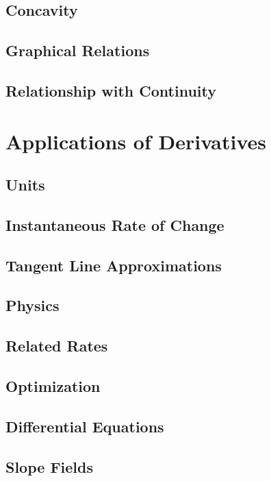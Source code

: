 \documentclass{article}
\begin{document}
\subsection{Concavity} 
\subsection{Graphical Relations} 
\subsection{Relationship with Continuity} 
\newpage
\section{Applications of Derivatives}
\subsection{Units}
\subsection{Instantaneous Rate of Change}
\subsection{Tangent Line Approximations}
\subsection{Physics}
\subsection{Related Rates}
\subsection{Optimization}
\subsection{Differential Equations}
\subsection{Slope Fields}\newpage
\end{document}
